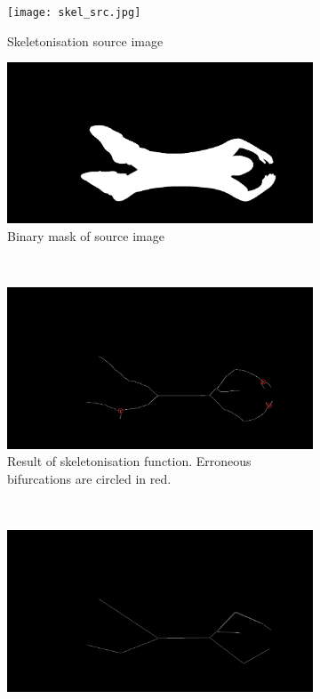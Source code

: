 \documentclass[a4paper, 12pt]{article}
\begin{document}
\begin{figure}[H]
	\centering
	\begin{subfigure}{.5\textwidth}
  		\centering
  		\texttt{[image: skel\_src.jpg]}
  		\caption{Skeletonisation source image}
  		\label{fig:skel_src}
	\end{subfigure}%
	\begin{subfigure}{.5\textwidth}
  		\centering
  		\includegraphics[width=.95\linewidth]{skel_src_mask.jpg}
  		\caption{Binary mask of source image}
  		\label{fig:skel_src_mask}
	\end{subfigure}\\
	\begin{subfigure}{\textwidth}
  		\centering
  		\includegraphics[width=\linewidth]{skel.jpg}
  		\caption{Result of skeletonisation function. Erroneous bifurcations are circled in red.}
  		\label{fig:skel}
	\end{subfigure}\\
	\begin{subfigure}{\textwidth}
  		\centering
  		\includegraphics[width=\linewidth]{skel_reduced.jpg}

\end{subfigure}
\end{figure}
\end{document}

